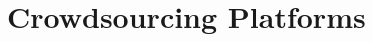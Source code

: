 \section{Crowdsourcing Platforms}\label{sec:cloud:crowdsourcing}

\newcommand{\campaignIAT}{\ensuremath{t_c}\xspace}
\newcommand{\campaignSize}{\ensuremath{\Theta}\xspace}
\newcommand{\taskDuration}{\ensuremath{B}\xspace}
\newcommand{\meanTaskLength}{\ensuremath{E[B]}\xspace}
\newcommand{\numberOfWorkers}{\ensuremath{c}\xspace}

\newcommand{\workerUtilization}{\ensuremath{\rho}\xspace}
\newcommand{\campaignDuration}{\ensuremath{\delta}\xspace}
\newcommand{\preTaskProcessingDelay}{\ensuremath{E[D]}\xspace}

\cite{Schwartz2015}



